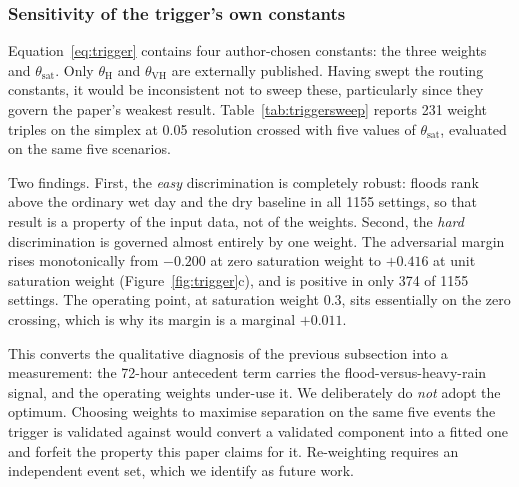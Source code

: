 \documentclass[journal]{IEEEtran}
\begin{document}
\subsubsection*{Sensitivity of the trigger's own constants}
\label{sec:res-trigger-sweep}
Equation~\eqref{eq:trigger} contains four author-chosen constants: the three
weights and $\theta_{\mathrm{sat}}$. Only $\theta_{\mathrm{H}}$ and
$\theta_{\mathrm{VH}}$ are externally published. Having swept the routing
constants, it would be inconsistent not to sweep these, particularly since they
govern the paper's weakest result. Table~\ref{tab:triggersweep} reports 231
weight triples on the simplex at 0.05 resolution crossed with five values of
$\theta_{\mathrm{sat}}$, evaluated on the same five scenarios.

Two findings. First, the \emph{easy} discrimination is completely robust: floods
rank above the ordinary wet day and the dry baseline in all \num{1155} settings,
so that result is a property of the input data, not of the weights.
Second, the \emph{hard} discrimination is governed almost entirely by one weight.
The adversarial margin rises monotonically from $-0.200$ at zero saturation
weight to $+0.416$ at unit saturation weight
(Figure~\ref{fig:trigger}c), and is positive in only 374 of \num{1155} settings.
The operating point, at saturation weight 0.3, sits essentially on the zero
crossing, which is why its margin is a marginal $+0.011$.

This converts the qualitative diagnosis of the previous subsection into a
measurement: the 72-hour antecedent term carries the flood-versus-heavy-rain
signal, and the operating weights under-use it. We deliberately do \emph{not}
adopt the optimum. Choosing weights to maximise separation on the same five
events the trigger is validated against would convert a validated component into
a fitted one and forfeit the property this paper claims for it. Re-weighting
requires an independent event set, which we identify as future work.
\end{document}
